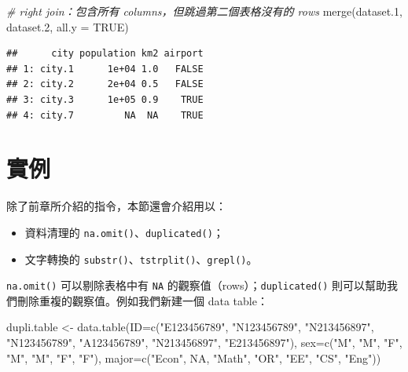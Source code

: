 \documentclass[
]{book}
\newenvironment{Shaded}{\begin{snugshade}}{\end{snugshade}}
\newcommand{\AttributeTok}[1]{\textcolor[rgb]{0.77,0.63,0.00}{#1}}
\newcommand{\CommentTok}[1]{\textcolor[rgb]{0.56,0.35,0.01}{\textit{#1}}}
\newcommand{\ConstantTok}[1]{\textcolor[rgb]{0.00,0.00,0.00}{#1}}
\newcommand{\FloatTok}[1]{\textcolor[rgb]{0.00,0.00,0.81}{#1}}
\newcommand{\FunctionTok}[1]{\textcolor[rgb]{0.00,0.00,0.00}{#1}}
\newcommand{\NormalTok}[1]{#1}
\newcommand{\OtherTok}[1]{\textcolor[rgb]{0.56,0.35,0.01}{#1}}
\newcommand{\StringTok}[1]{\textcolor[rgb]{0.31,0.60,0.02}{#1}}
\providecommand{\tightlist}{%
  \setlength{\itemsep}{0pt}\setlength{\parskip}{0pt}}
\theoremstyle{definition}
\theoremstyle{remark}
\begin{document}
\begin{Shaded}
\begin{Highlighting}[]
\CommentTok{\# right join：包含所有 columns，但跳過第二個表格沒有的 rows}
\FunctionTok{merge}\NormalTok{(dataset}\FloatTok{.1}\NormalTok{, dataset}\FloatTok{.2}\NormalTok{, }\AttributeTok{all.y =} \ConstantTok{TRUE}\NormalTok{)}
\end{Highlighting}
\end{Shaded}

\begin{verbatim}
##      city population km2 airport
## 1: city.1      1e+04 1.0   FALSE
## 2: city.2      2e+04 0.5   FALSE
## 3: city.3      1e+05 0.9    TRUE
## 4: city.7         NA  NA    TRUE
\end{verbatim}

\hypertarget{ux5be6ux4f8b}{%
\section{實例}\label{ux5be6ux4f8b}}

除了前章所介紹的指令，本節還會介紹用以：

\begin{itemize}
\tightlist
\item
  資料清理的 \texttt{na.omit()}、\texttt{duplicated()}；
\item
  文字轉換的 \texttt{substr()}、\texttt{tstrplit()}、\texttt{grepl()}。
\end{itemize}

\texttt{na.omit()} 可以剔除表格中有 \texttt{NA} 的觀察值（rows）；\texttt{duplicated()} 則可以幫助我們刪除重複的觀察值。例如我們新建一個 data table：

\begin{Shaded}
\begin{Highlighting}[]
\NormalTok{dupli.table }\OtherTok{\textless{}{-}} \FunctionTok{data.table}\NormalTok{(}\AttributeTok{ID=}\FunctionTok{c}\NormalTok{(}\StringTok{"E123456789"}\NormalTok{, }\StringTok{"N123456789"}\NormalTok{, }\StringTok{"N213456897"}\NormalTok{, }\StringTok{"N123456789"}\NormalTok{, }\StringTok{"A123456789"}\NormalTok{, }\StringTok{"N213456897"}\NormalTok{, }\StringTok{"E213456897"}\NormalTok{), }\AttributeTok{sex=}\FunctionTok{c}\NormalTok{(}\StringTok{"M"}\NormalTok{, }\StringTok{"M"}\NormalTok{, }\StringTok{"F"}\NormalTok{, }\StringTok{"M"}\NormalTok{, }\StringTok{"M"}\NormalTok{, }\StringTok{"F"}\NormalTok{, }\StringTok{"F"}\NormalTok{), }\AttributeTok{major=}\FunctionTok{c}\NormalTok{(}\StringTok{"Econ"}\NormalTok{, }\ConstantTok{NA}\NormalTok{, }\StringTok{"Math"}\NormalTok{, }\StringTok{"OR"}\NormalTok{, }\StringTok{"EE"}\NormalTok{, }\StringTok{"CS"}\NormalTok{, }\StringTok{"Eng"}\NormalTok{))}
\end{Highlighting}
\end{Shaded}
\end{document}
